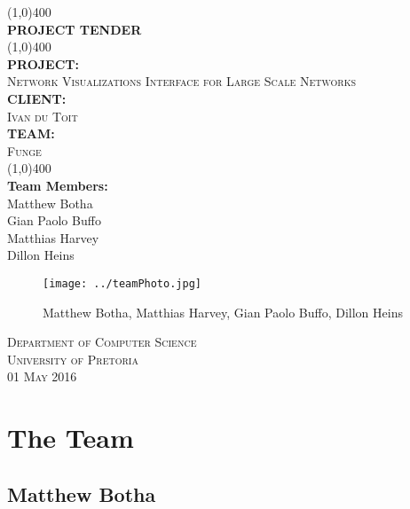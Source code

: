 \documentclass{article}
\begin{document}
\begin{titlepage}
	\begin{center}
		\line(1,0){400}\\
		[6mm]
		\huge{\bfseries PROJECT TENDER}\\
		[2mm]
		\line(1,0){400}\\
		[5mm]
		\large\textbf{PROJECT:}\\\textsc{Network Visualizations Interface for Large Scale Networks}\\
		[3mm]
		\large\textbf{CLIENT:}\\\textsc{Ivan du Toit}\\
		[3mm]
		\large \textbf{TEAM:}\\\textsc{Funge}\\
		\line(1,0){400}\\
		[5mm]
		\large \textbf{Team Members:}\\
		[3mm]
		\large Matthew Botha\\
		\large Gian Paolo Buffo\\
		\large Matthias Harvey\\
        \large Dillon Heins\\[3mm]
		\begin{figure}[H]
			\centering
			\texttt{[image: ../teamPhoto.jpg]}
			\caption{Matthew Botha, Matthias Harvey, Gian Paolo Buffo, Dillon Heins}
		\end{figure}
    \end{center}

	\vspace{7mm}

    \begin{flushright}
        \textsc{\large Department of Computer Science\\
        University of Pretoria\\
        01 May 2016\\}
    \end{flushright}
\end{titlepage}

\section{The Team}
	\subsection{Matthew Botha}
		
\end{document}
